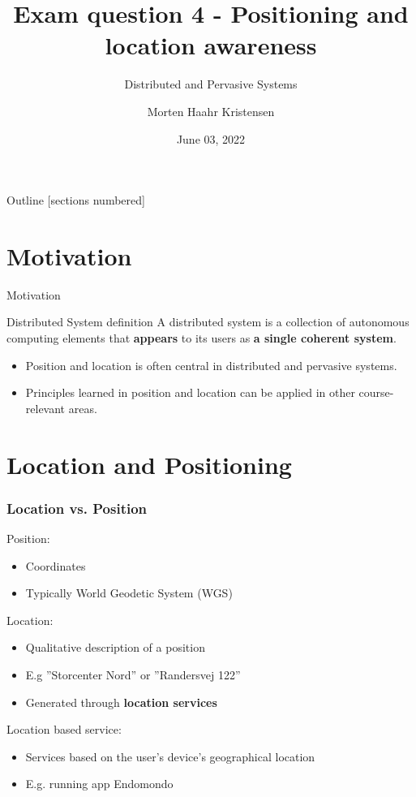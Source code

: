 \documentclass[10pt]{beamer}
\title[Positioning and location awareness]{Exam question 4 - Positioning and location awareness}
\subtitle{Distributed and Pervasive Systems}
\date{June 03, 2022}
\author[M.H. Kristensen]{Morten Haahr Kristensen}
\institute{Department of Electrical and Computer Engineering - Aarhus University}
\begin{document}
\maketitle

\begin{frame}{Outline}
  [sections numbered]
  \tableofcontents[hideallsubsections]
\end{frame}

\section{Motivation}

\begin{frame}{Motivation}
  \begin{alertblock}{Distributed System definition \cite{vansteenDistributedSystems2018}}
    A distributed system is a collection of autonomous computing elements that \textbf{appears} to its users as \textbf{a single coherent system}.
  \end{alertblock}
  \begin{itemize}
    \item Position and location is often central in distributed and pervasive systems.
    \item Principles learned in position and location can be applied in other course-relevant areas.
  \end{itemize}
\end{frame}

\section{Location and Positioning}

\begin{frame}
  \frametitle{Location vs. Position}

  Position:
  \vspace*{-0.7em}
  \begin{itemize}
    \item Coordinates
    \item Typically World Geodetic System (WGS)
  \end{itemize}

  Location:
  \vspace*{-0.7em}
  \begin{itemize}
    \item Qualitative description of a position
    \item E.g ''Storcenter Nord'' or ''Randersvej 122''
    \item Generated through \textbf{location services}
  \end{itemize}

  Location based service:
  \vspace*{-0.7em}
  \begin{itemize}
    \item Services based on the user's device's geographical location
    \item E.g. running app Endomondo
  \end{itemize}

\end{frame}
\end{document}

